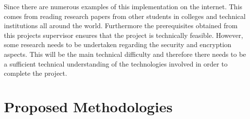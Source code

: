 Since there are numerous examples of this implementation on the internet. This comes from reading research papers from other students in colleges and technical institutions all around the world. Furthermore the prerequisites obtained from this projects supervisor ensures that the project is technically feasible. However, some research needs to be undertaken regarding the security and encryption aspects. This will be the main technical difficulty and therefore there needs to be a sufficient technical understanding of the technologies involved in order to complete the project.

\section{Proposed Methodologies}

